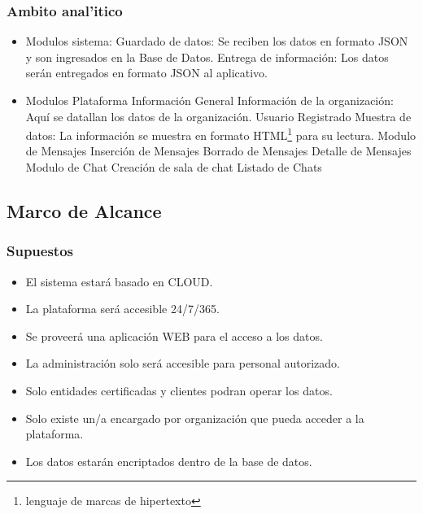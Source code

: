 \documentclass[letterpaper,openright,10pt,oneside]{report}
\begin{document}
					\subsubsection{Ambito anal'itico}
						\begin{itemize}
							\item Modulos sistema:
								\subitem Guardado de datos: Se reciben los datos en formato JSON y son ingresados en la Base de Datos.
								\subitem Entrega de información: Los datos serán entregados en formato JSON al aplicativo.
							\item Modulos Plataforma
								\subitem Información General
									\subsubitem Información de la organización: Aquí se datallan los datos de la organización.
								\subitem Usuario Registrado
									\subsubitem Muestra de datos: La información se muestra en formato HTML\footnote{lenguaje de marcas de hipertexto} para su lectura.
								\subitem Modulo de Mensajes
									\subsubitem Inserción de Mensajes
									\subsubitem Borrado de Mensajes
									\subsubitem Detalle de Mensajes
								\subitem Modulo de Chat
									\subsubitem Creación de sala de chat
									\subsubitem Listado de Chats
						\end{itemize}
				\subsection{Marco de Alcance}	
						\subsubsection{Supuestos}
							\begin{itemize}
								\item El sistema estará basado en CLOUD.
								\item La plataforma será accesible 24/7/365.
								\item Se proveerá una aplicación WEB para el acceso a los datos.
								\item La administración solo será accesible para personal autorizado.
								\item Solo entidades certificadas y clientes podran operar los datos.
								\item Solo existe un/a encargado por organización que pueda acceder a la plataforma.
								\item Los datos estarán encriptados dentro de la base de datos.
							\end{itemize}
\end{document}
